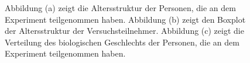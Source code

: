 \documentclass[a4paper,11pt]{article}%
\renewcommand{\\}{\vspace*{0.5\baselineskip} \newline}
\begin{document}
	\begin{figure}[h]
  \centering
  \qquad
  \qquad
  \caption[Altersstruktur, Boxplot des Alters und biologisches Geschlecht der Teilnehmer]{Abbildung (a) zeigt die Altersstruktur der Personen, die an dem Experiment teilgenommen haben. Abbildung (b) zeigt den Boxplot der Altersstruktur der Versuchsteilnehmer. Abbildung (c) zeigt die Verteilung des biologischen Geschlechts der Personen, die an dem Experiment teilgenommen haben.}
  \label{teilnehmer Alter}
\end{figure}
\end{document}
